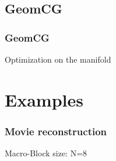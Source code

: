 \documentclass{beamer}
\begin{document}
\subsection{GeomCG}

\begin{frame}
\frametitle{GeomCG}
Optimization on the manifold
\end{frame}


\section{Examples}

\begin{frame}
\frametitle{Movie reconstruction}
Macro-Block size: N=8
\begin{center}
\end{center}
\end{frame}
\end{document}
